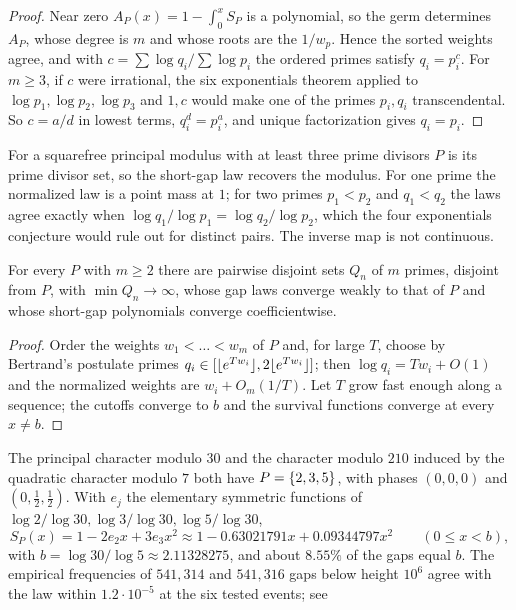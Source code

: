 \begin{proof}
Near zero $A_P(x)=1-\int_0^xS_P$ is a polynomial, so the germ determines $A_P$, whose degree is $m$
and whose roots are the $1/w_p$. Hence the sorted weights agree, and with
$c=\sum\log q_i/\sum\log p_i$ the ordered primes satisfy $q_i=p_i^c$. For $m\ge3$, if $c$ were
irrational, the six exponentials theorem \cite{Waldschmidt2005Further} applied to
$\log p_1,\log p_2,\log p_3$ and $1,c$ would make one of the primes $p_i,q_i$ transcendental. So
$c=a/d$ in lowest terms, $q_i^d=p_i^a$, and unique factorization gives $q_i=p_i$.
\end{proof}

For a squarefree principal modulus with at least three prime divisors $P$ is its prime divisor set,
so the short-gap law recovers the modulus. For one prime the normalized law is a point mass at $1$;
for two primes $p_1<p_2$ and $q_1<q_2$ the laws agree exactly when
$\log q_1/\log p_1=\log q_2/\log p_2$, which the four exponentials conjecture would rule out for
distinct pairs. The inverse map is not continuous.

\begin{proposition}\label{rec:prop:gapinstab}
For every $P$ with $m\ge2$ there are pairwise disjoint sets $Q_n$ of $m$ primes, disjoint from $P$,
with $\min Q_n\to\infty$, whose gap laws converge weakly to that of $P$ and whose short-gap
polynomials converge coefficientwise.
\end{proposition}

\begin{proof}
Order the weights $w_1<\dots<w_m$ of $P$ and, for large $T$, choose by Bertrand's postulate
primes $q_i\in[\lfloor e^{Tw_i}\rfloor,2\lfloor e^{Tw_i}\rfloor]$; then $\log q_i=Tw_i+O(1)$ and the
normalized weights are $w_i+O_m(1/T)$. Let $T$ grow fast enough along a sequence; the cutoffs
converge to $b$ and the survival functions converge at every $x\ne b$.
\end{proof}

\begin{example}\label{rec:ex:gaps30}
The principal character modulo $30$ and the character modulo $210$ induced by the quadratic
character modulo $7$ both have $P=\{2,3,5\}$, with phases $(0,0,0)$ and $(0,\tfrac12,\tfrac12)$.
With $e_j$ the elementary symmetric functions of $\log2/\log30,\log3/\log30,\log5/\log30$,
\[
 S_P(x)=1-2e_2x+3e_3x^2\approx1-0.63021791x+0.09344797x^2\qquad(0\le x<b),
\]
with $b=\log30/\log5\approx2.11328275$, and about $8.55\%$ of the gaps equal $b$. The empirical
frequencies of $541{,}314$ and $541{,}316$ gaps below height $10^6$ agree with the law within
$1.2\cdot10^{-5}$ at the six tested events; see
\begin{center}
\\
\end{center}
\end{example}

